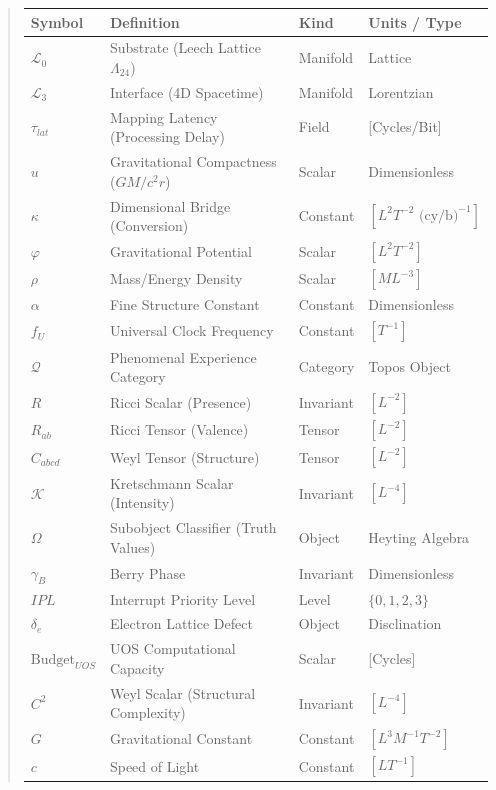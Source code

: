 \documentclass[11pt,titlepage]{article}
\newcommand{\substrate}{\mathcal{L}_0}
\newcommand{\interface}{\mathcal{L}_3}
\newcommand{\leech}{\Lambda_{24}}
\newcommand{\classifier}{\Omega}
\begin{document}
\begin{abstract}
\begin{table}[h!]
\centering
\begin{tabular}{@{}llll@{}}
\toprule
\textbf{Symbol} & \textbf{Definition} & \textbf{Kind} & \textbf{Units / Type} \\ \midrule
$\substrate$ & Substrate (Leech Lattice $\leech$) & Manifold & Lattice \\
$\interface$ & Interface (4D Spacetime) & Manifold & Lorentzian \\
$\tau_{lat}$ & Mapping Latency (Processing Delay) & Field & [Cycles/Bit] \\
$u$ & Gravitational Compactness ($GM/c^2r$) & Scalar & Dimensionless \\
$\kappa$ & Dimensional Bridge (Conversion) & Constant & $[L^2 T^{-2} \text{ (cy/b)}^{-1}]$ \\
$\varphi$ & Gravitational Potential & Scalar & $[L^2 T^{-2}]$ \\
$\rho$ & Mass/Energy Density & Scalar & $[M L^{-3}]$ \\
$\alpha$ & Fine Structure Constant & Constant & Dimensionless \\
$f_U$ & Universal Clock Frequency & Constant & $[T^{-1}]$ \\
$\mathcal{Q}$ & Phenomenal Experience Category & Category & Topos Object \\
$R$ & Ricci Scalar (Presence) & Invariant & $[L^{-2}]$ \\
$R_{ab}$ & Ricci Tensor (Valence) & Tensor & $[L^{-2}]$ \\
$C_{abcd}$ & Weyl Tensor (Structure) & Tensor & $[L^{-2}]$ \\
$\mathcal{K}$ & Kretschmann Scalar (Intensity) & Invariant & $[L^{-4}]$ \\
$\classifier$ & Subobject Classifier (Truth Values) & Object & Heyting Algebra \\
$\gamma_B$ & Berry Phase & Invariant & Dimensionless \\
$IPL$ & Interrupt Priority Level & Level & $\{0, 1, 2, 3\}$ \\
$\delta_e$ & Electron Lattice Defect & Object & Disclination \\
$\text{Budget}_{UOS}$ & UOS Computational Capacity & Scalar & [Cycles] \\
$C^2$ & Weyl Scalar (Structural Complexity) & Invariant & $[L^{-4}]$ \\
$G$ & Gravitational Constant & Constant & $[L^3 M^{-1} T^{-2}]$ \\
$c$ & Speed of Light & Constant & $[L T^{-1}]$ \\

\end{tabular}
\end{table}
\end{abstract}
\end{document}
